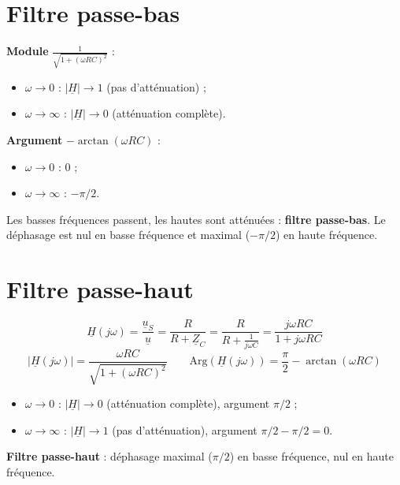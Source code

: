 \section{Filtre passe-bas}


\begin{propbox}[title={Passe-bas $\underline H = \frac1{1+j\omega RC}$ : étude aux limites}]
\textbf{Module} $\frac1{\sqrt{1+(\omega RC)^2}}$ :
\begin{itemize}
  \item $\omega\to0$ : $|\underline H|\to1$ (pas d'atténuation) ;
  \item $\omega\to\infty$ : $|\underline H|\to0$ (atténuation complète).
\end{itemize}
\textbf{Argument} $-\arctan(\omega RC)$ :
\begin{itemize}
  \item $\omega\to0$ : $0$ ;
  \item $\omega\to\infty$ : $-\pi/2$.
\end{itemize}
Les basses fréquences passent, les hautes sont atténuées : \textbf{filtre passe-bas}. Le
déphasage est nul en basse fréquence et maximal ($-\pi/2$) en haute fréquence.
\end{propbox}

\section{Filtre passe-haut}


\begin{propbox}[title={Passe-haut : R et C permutés}]
\[ \underline H(j\omega) = \frac{\underline u_S}{\underline u} = \frac{R}{R + \underline Z_C}
   = \frac{R}{R + \frac1{j\omega C}} = \frac{j\omega RC}{1 + j\omega RC} \]
\[ |\underline H(j\omega)| = \frac{\omega RC}{\sqrt{1 + (\omega RC)^2}} \qquad
   \mathrm{Arg}(\underline H(j\omega)) = \frac\pi2 - \arctan(\omega RC) \]
\begin{itemize}
  \item $\omega\to0$ : $|\underline H|\to0$ (atténuation complète), argument $\pi/2$ ;
  \item $\omega\to\infty$ : $|\underline H|\to1$ (pas d'atténuation), argument
        $\pi/2 - \pi/2 = 0$.
\end{itemize}
\textbf{Filtre passe-haut} : déphasage maximal ($\pi/2$) en basse fréquence, nul en haute
fréquence.
\end{propbox}

